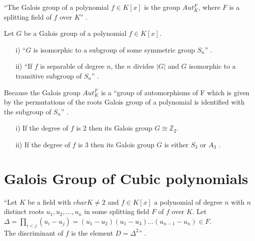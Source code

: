 \begin{definition}
  ``The Galois group of a polynomial \(f \in K[x]\) is the group \(Aut_K^F\), where \(F\) is a splitting field of \(f\) over \(K\)'' \cite{hunger}.
  \end{definition}

  \begin{theorem}
  Let \(G\) be a Galois group of a polynomial \(f \in K[x]\).
\begin{enumerate}
\item[i)] ``\(G\) is isomorphic to a subgroup of some symmetric group \(S_n\)'' \cite{hunger}.
  \item[ii)] ``If \(f\) is separable of degree \(n\), the \(n\) divides \(|G|\) and \(G\) isomorphic to a transitive subgroup of \(S_n\)'' \cite{hunger}.
  \end{enumerate}
\end{theorem}
Because the Galois group \(Aut_K^F\) is a ``group of automorphisms of F which is given by the permutations of the roots Galois group of a polynomial is identified with the subgroup of \(S_n\)'' \cite{hunger}.
\vspace{3mm}

\begin{corollary}
\begin{enumerate}
\item[i)] If the degree of \(f\) is \(2\) then its Galois group \(G \cong {\mathbb{Z}}_2\).
  \item[ii)] If the degree of \(f\) is \(3\) then its Galois group \(G\) is either \(S_3\) or \(A_3\) \cite{hunger}.
  \end{enumerate}
\end{corollary}


\section{Galois Group of Cubic polynomials}
\begin{definition}
  ``Let \(K\) be a field with \(char K \neq 2\) and \(f \in K[x]\) a polynomial of degree \(n\) with \(n\) distinct roots \(u_1,u_2,...,u_n\) in some splitting field \(F\) of \(f\) over \(K\). Let \(\Delta = \prod\limits_{i<j}(u_i-u_j) = (u_1-u_2)(u_1-u_3)...(u_{n-1}-u_n) \in F\).\\
  The discriminant of \(f\) is the element \(D= {\Delta}^2\)'' \cite{hunger}.
\end{definition}

